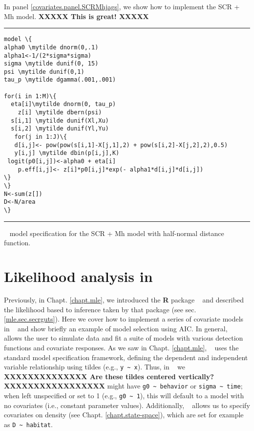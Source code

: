 In panel \ref{covariates.panel.SCRMhjags}, we show how to implement the SCR + Mh model.  
{\bf XXXXX This is great! XXXXX}
\begin{panel}[htp]
\centering
\rule[0.1in]{\textwidth}{.03in}
{\small
\begin{Verbatim}[commandchars=\\\{\}]
model \{
alpha0 \mytilde dnorm(0,.1)
alpha1<-1/(2*sigma*sigma)
sigma \mytilde dunif(0, 15)
psi \mytilde dunif(0,1)
tau_p \mytilde dgamma(.001,.001)

for(i in 1:M)\{
  eta[i]\mytilde dnorm(0, tau_p)
    z[i] \mytilde dbern(psi)
  s[i,1] \mytilde dunif(Xl,Xu)
  s[i,2] \mytilde dunif(Yl,Yu)
   for(j in 1:J)\{
   d[i,j]<- pow(pow(s[i,1]-X[j,1],2) + pow(s[i,2]-X[j,2],2),0.5)
   y[i,j] \mytilde dbin(p[i,j],K)
 logit(p0[i,j])<-alpha0 + eta[i]
    p.eff[i,j]<- z[i]*p0[i,j]*exp(- alpha1*d[i,j]*d[i,j])
\}
\}
N<-sum(z[])
D<-N/area
\}

\end{Verbatim}
}

\rule[-0.1in]{\textwidth}{.03in}
\caption{
\jags~ model specification for the SCR + Mh model with half-normal distance
function.}
\label{covariates.panel.SCRMhjags}
\end{panel}







\section{Likelihood analysis in \secr}
\label{likelihood.secr}

Previously, in Chapt. \ref{chapt.mle}, we introduced the {\bf R}
package \secr~ and described the likelihood based to inference taken
by that package (see sec. \ref{mle.sec.secrguts}).  Here we cover how
to implement a series of covariate models in \secr~ and show briefly
an example of model selection using AIC.  In general, \secr~ allows
the user to simulate data and fit a suite of models with various
detection functions and covariate responses.  As we saw in
Chapt. \ref{chapt.mle}, \secr~ uses the standard \R model
specification framework, defining the dependent and independent
variable relationship using tildes (e.g., \Verb+y ~ x+).  Thus, in
\secr~ we 
{\bf XXXXXXXXXXXXXX Are these tildes centered vertically?
  XXXXXXXXXXXXXXXXX} 
might have \verb+g0 ~ behavior+ or
\verb+sigma ~ time+; when left unspecified or set to 1 (e.g.,
\verb+g0 ~ 1+), this will default to a model with no covariates (i.e.,
constant parameter values).  Additionally, \secr~ allows us to specify
covariates on density (see Chapt. \ref{chapt.state-space}), which are set for
example as \verb+D ~ habitat+.

